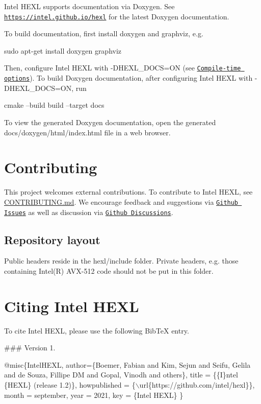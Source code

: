 Intel H\+E\+XL supports documentation via Doxygen. See \href{https://intel.github.io/hexl}{\tt https\+://intel.\+github.\+io/hexl} for the latest Doxygen documentation.

To build documentation, first install {\ttfamily doxygen} and {\ttfamily graphviz}, e.\+g. 
\begin{DoxyCode}
sudo apt-get install doxygen graphviz
\end{DoxyCode}
 Then, configure Intel H\+E\+XL with {\ttfamily -\/\+D\+H\+E\+X\+L\+\_\+\+D\+O\+CS=ON} (see \href{#compile-time-options}{\tt Compile-\/time options}). To build Doxygen documentation, after configuring Intel H\+E\+XL with {\ttfamily -\/\+D\+H\+E\+X\+L\+\_\+\+D\+O\+CS=ON}, run 
\begin{DoxyCode}
cmake --build build --target docs
\end{DoxyCode}
 To view the generated Doxygen documentation, open the generated {\ttfamily docs/doxygen/html/index.\+html} file in a web browser.

\section*{Contributing}

This project welcomes external contributions. To contribute to Intel H\+E\+XL, see \hyperlink{CONTRIBUTING_8md}{C\+O\+N\+T\+R\+I\+B\+U\+T\+I\+NG.md}. We encourage feedback and suggestions via \href{https://github.com/intel/hexl/issues}{\tt Github Issues} as well as discussion via \href{https://github.com/intel/hexl/discussions}{\tt Github Discussions}.

\subsection*{Repository layout}

Public headers reside in the {\ttfamily hexl/include} folder. Private headers, e.\+g. those containing Intel(\+R) A\+V\+X-\/512 code should not be put in this folder.

\section*{Citing Intel H\+E\+XL}

To cite Intel H\+E\+XL, please use the following Bib\+TeX entry.

\#\#\# Version 1. 
\begin{DoxyCode}
@misc\{IntelHEXL,
    author=\{Boemer, Fabian and Kim, Sejun and Seifu, Gelila and de Souza, Fillipe DM and Gopal, Vinodh and
       others\},
    title = \{\{I\}ntel \{HEXL\} (release 1.2)\},
    howpublished = \{\(\backslash\)url\{https://github.com/intel/hexl\}\},
    month = september,
    year = 2021,
    key = \{Intel HEXL\}
\}
\end{DoxyCode}



